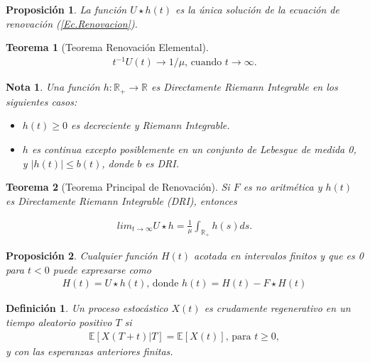 \documentclass{article}
\newtheorem{Def}{Definición}
\newtheorem{Teo}{Teorema}
\newtheorem{Note}{Nota}
\newtheorem{Prop}{Proposición}
\newcommand{\rea}{\mathbb{R}}
\newcommand{\esp}{\mathbb{E}}
\begin{document}
\begin{Prop}
La funci\'on $U\star h\left(t\right)$ es la \'unica soluci\'on de la ecuaci\'on de renovaci\'on (\ref{Ec.Renovacion}).
\end{Prop}

\begin{Teo}[Teorema Renovaci\'on Elemental]
\begin{eqnarray*}
t^{-1}U\left(t\right)\rightarrow 1/\mu\textrm{,    cuando }t\rightarrow\infty.
\end{eqnarray*}
\end{Teo}


\begin{Note} Una funci\'on $h:\rea_{+}\rightarrow\rea$ es Directamente Riemann Integrable en los siguientes casos:
\begin{itemize}
\item[a)] $h\left(t\right)\geq0$ es decreciente y Riemann Integrable.
\item[b)] $h$ es continua excepto posiblemente en un conjunto de Lebesgue de medida 0, y $|h\left(t\right)|\leq b\left(t\right)$, donde $b$ es DRI.
\end{itemize}
\end{Note}

\begin{Teo}[Teorema Principal de Renovaci\'on]
Si $F$ es no aritm\'etica y $h\left(t\right)$ es Directamente Riemann Integrable (DRI), entonces

\begin{eqnarray*}
lim_{t\rightarrow\infty}U\star h=\frac{1}{\mu}\int_{\rea_{+}}h\left(s\right)ds.
\end{eqnarray*}
\end{Teo}

\begin{Prop}
Cualquier funci\'on $H\left(t\right)$ acotada en intervalos finitos y que es 0 para $t<0$ puede expresarse como
\begin{eqnarray*}
H\left(t\right)=U\star h\left(t\right)\textrm{,  donde }h\left(t\right)=H\left(t\right)-F\star H\left(t\right)
\end{eqnarray*}
\end{Prop}

\begin{Def}
Un proceso estoc\'astico $X\left(t\right)$ es crudamente regenerativo en un tiempo aleatorio positivo $T$ si
\begin{eqnarray*}
\esp\left[X\left(T+t\right)|T\right]=\esp\left[X\left(t\right)\right]\textrm{, para }t\geq0,\end{eqnarray*}
y con las esperanzas anteriores finitas.
\end{Def}
\end{document}
